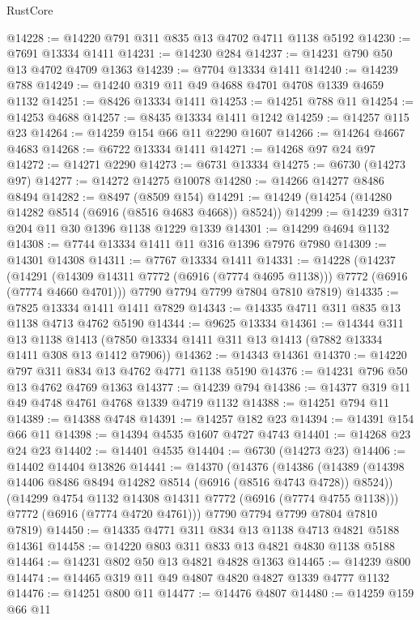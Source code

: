 \begin{lexlean}{RustCore}
\begin{coremodule}
@14228 := @14220 @791 @311 @835 @13 @4702 @4711 @1138 @5192
@14230 := @7691 @13334 @1411
@14231 := @14230 @284
@14237 := @14231 @790 @50 @13 @4702 @4709 @1363
@14239 := @7704 @13334 @1411
@14240 := @14239 @788
@14249 := @14240 @319 @11 @49 @4688 @4701 @4708 @1339 @4659 @1132
@14251 := @8426 @13334 @1411
@14253 := @14251 @788 @11
@14254 := @14253 @4688
@14257 := @8435 @13334 @1411 @1242
@14259 := @14257 @115 @23
@14264 := @14259 @154 @66 @11 @2290 @1607
@14266 := @14264 @4667 @4683
@14268 := @6722 @13334 @1411
@14271 := @14268 @97 @24 @97
@14272 := @14271 @2290
@14273 := @6731 @13334
@14275 := @6730 (@14273 @97)
@14277 := @14272 @14275 @10078
@14280 := @14266 @14277 @8486 @8494
@14282 := @8497 (@8509 @154)
@14291 := @14249 (@14254 (@14280 @14282 @8514 (@6916 (@8516 @4683 @4668)) @8524))
@14299 := @14239 @317 @204 @11 @30 @1396 @1138 @1229 @1339
@14301 := @14299 @4694 @1132
@14308 := @7744 @13334 @1411 @11 @316 @1396 @7976 @7980
@14309 := @14301 @14308
@14311 := @7767 @13334 @1411
@14331 := @14228
    (@14237
      (@14291 (@14309 @14311 @7772 (@6916 (@7774 @4695 @1138))) @7772 (@6916 (@7774 @4660 @4701)))
      @7790
      @7794
      @7799
      @7804
      @7810
      @7819)
@14335 := @7825 @13334 @1411 @1411 @7829
@14343 := @14335 @4711 @311 @835 @13 @1138 @4713 @4762 @5190
@14344 := @9625 @13334
@14361 := @14344
    @311
    @13
    @1138
    @1413
    (@7850 @13334 @1411 @311 @13 @1413 (@7882 @13334 @1411 @308 @13 @1412 @7906))
@14362 := @14343 @14361
@14370 := @14220 @797 @311 @834 @13 @4762 @4771 @1138 @5190
@14376 := @14231 @796 @50 @13 @4762 @4769 @1363
@14377 := @14239 @794
@14386 := @14377 @319 @11 @49 @4748 @4761 @4768 @1339 @4719 @1132
@14388 := @14251 @794 @11
@14389 := @14388 @4748
@14391 := @14257 @182 @23
@14394 := @14391 @154 @66 @11
@14398 := @14394 @4535 @1607 @4727 @4743
@14401 := @14268 @23 @24 @23
@14402 := @14401 @4535
@14404 := @6730 (@14273 @23)
@14406 := @14402 @14404 @13826
@14441 := @14370
    (@14376
      (@14386
        (@14389 (@14398 @14406 @8486 @8494 @14282 @8514 (@6916 (@8516 @4743 @4728)) @8524))
        (@14299 @4754 @1132 @14308 @14311 @7772 (@6916 (@7774 @4755 @1138)))
        @7772
        (@6916 (@7774 @4720 @4761)))
      @7790
      @7794
      @7799
      @7804
      @7810
      @7819)
@14450 := @14335 @4771 @311 @834 @13 @1138 @4713 @4821 @5188 @14361
@14458 := @14220 @803 @311 @833 @13 @4821 @4830 @1138 @5188
@14464 := @14231 @802 @50 @13 @4821 @4828 @1363
@14465 := @14239 @800
@14474 := @14465 @319 @11 @49 @4807 @4820 @4827 @1339 @4777 @1132
@14476 := @14251 @800 @11
@14477 := @14476 @4807
@14480 := @14259 @159 @66 @11

\end{coremodule}
\end{lexlean}

